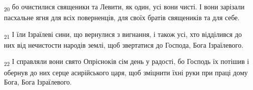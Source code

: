 \begin{tcolorbox}
\textsubscript{20} бо очистилися священики та Левити, як один, усі вони чисті. І вони зарізали пасхальне ягня для всіх поверненців, для своїх братів священиків та для себе.
\end{tcolorbox}
\begin{tcolorbox}
\textsubscript{21} І їли Ізраїлеві сини, що вернулися з вигнання, і також усі, хто відділився до них від нечистости народів землі, щоб звертатися до Господа, Бога Ізраїлевого.
\end{tcolorbox}
\begin{tcolorbox}
\textsubscript{22} І справляли вони свято Опрісноків сім день у радості, бо Господь їх потішив і обернув до них серце асирійського царя, щоб зміцнити їхні руки при праці дому Бога, Бога Ізраїлевого.
\end{tcolorbox}
